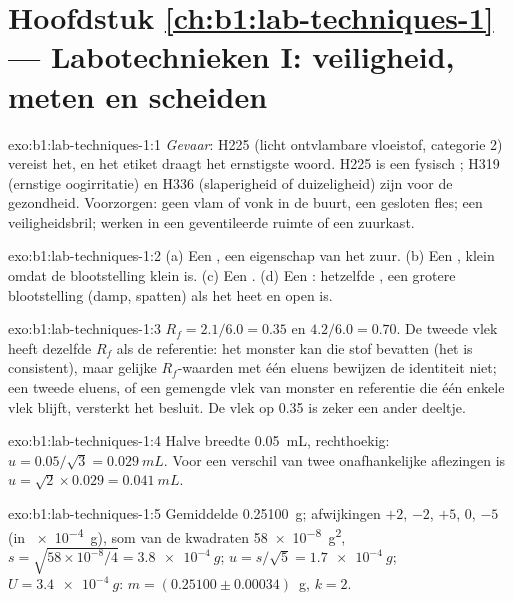 \section*{Hoofdstuk \ref{ch:b1:lab-techniques-1} --- Labotechnieken I: veiligheid, meten en scheiden}

\begin{solution}{exo:b1:lab-techniques-1:1}
\emph{Gevaar}: H225 (licht ontvlambare vloeistof, categorie 2) vereist
het, en het etiket draagt het ernstigste woord. H225 is een fysisch
; H319 (ernstige oogirritatie) en H336 (slaperigheid of
duizeligheid) zijn  voor de gezondheid. Voorzorgen: geen vlam of
vonk in de buurt, een gesloten fles; een veiligheidsbril; werken in een
geventileerde ruimte of een zuurkast.
\end{solution}

\begin{solution}{exo:b1:lab-techniques-1:2}
(a) Een , een eigenschap van het zuur. (b) Een , klein omdat
de blootstelling klein is. (c) Een . (d) Een : hetzelfde
, een grotere blootstelling (damp, spatten) als het heet en open is.
\end{solution}

\begin{solution}{exo:b1:lab-techniques-1:3}
$R_f = 2.1/6.0 = 0.35$ en $4.2/6.0 = 0.70$. De tweede vlek heeft dezelfde
$R_f$ als de referentie: het monster kan die stof bevatten (het is
consistent), maar gelijke $R_f$-waarden met één eluens bewijzen de
identiteit niet; een tweede eluens, of een gemengde vlek van monster en
referentie die één enkele vlek blijft, versterkt het besluit. De vlek op
0.35 is zeker een ander deeltje.
\end{solution}

\begin{solution}{exo:b1:lab-techniques-1:4}
Halve breedte \qty{0.05}{mL}, rechthoekig: $u = 0.05/\sqrt3 = \qty{0.029}{mL}$.
Voor een verschil van twee onafhankelijke aflezingen is
$u = \sqrt{2} \times 0.029 = \qty{0.041}{mL}$.
\end{solution}

\begin{solution}{exo:b1:lab-techniques-1:5}
Gemiddelde \qty{0.25100}{g}; afwijkingen $+2$, $-2$, $+5$, 0, $-5$ (in
\qty{e-4}{g}), som van de kwadraten \qty{58e-8}{g^2}, $s = \sqrt{58 \times
10^{-8}/4} = \qty{3.8e-4}{g}$; $u = s/\sqrt5 = \qty{1.7e-4}{g}$;
$U = \qty{3.4e-4}{g}$: $m = (0.25100 \pm 0.00034)$~g, $k = 2$.
\end{solution}

